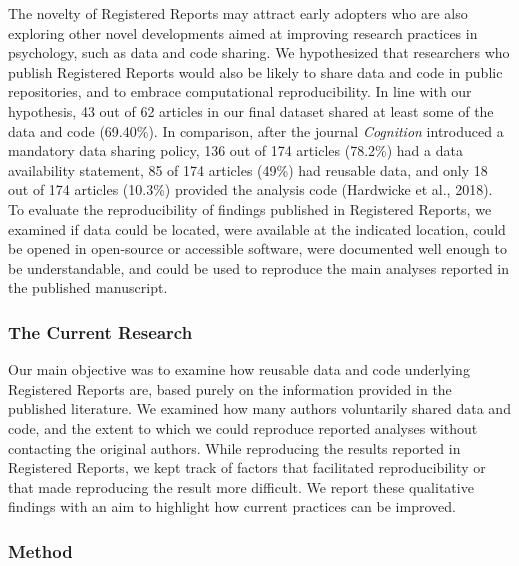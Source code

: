 \documentclass[,jou, a4paper,floatsintext]{apa6}
\begin{document}
The novelty of Registered Reports may attract early adopters who are also exploring other novel developments aimed at improving research practices in psychology, such as data and code sharing. We hypothesized that researchers who publish Registered Reports would also be likely to share data and code in public repositories, and to embrace computational reproducibility. In line with our hypothesis, 43 out of 62 articles in our final dataset shared at least some of the data and code (69.40\%). In comparison, after the journal \emph{Cognition} introduced a mandatory data sharing policy, 136 out of 174 articles (78.2\%) had a data availability statement, 85 of 174 articles (49\%) had reusable data, and only 18 out of 174 articles (10.3\%) provided the analysis code (Hardwicke et al., 2018). To evaluate the reproducibility of findings published in Registered Reports, we examined if data could be located, were available at the indicated location, could be opened in open-source or accessible software, were documented well enough to be understandable, and could be used to reproduce the main analyses reported in the published manuscript.

\hypertarget{the-current-research}{%
\subsubsection{The Current Research}\label{the-current-research}}

Our main objective was to examine how reusable data and code underlying Registered Reports are, based purely on the information provided in the published literature. We examined how many authors voluntarily shared data and code, and the extent to which we could reproduce reported analyses without contacting the original authors. While reproducing the results reported in Registered Reports, we kept track of factors that facilitated reproducibility or that made reproducing the result more difficult. We report these qualitative findings with an aim to highlight how current practices can be improved.

\hypertarget{method}{%
\subsubsection{Method}\label{method}}
\end{document}

